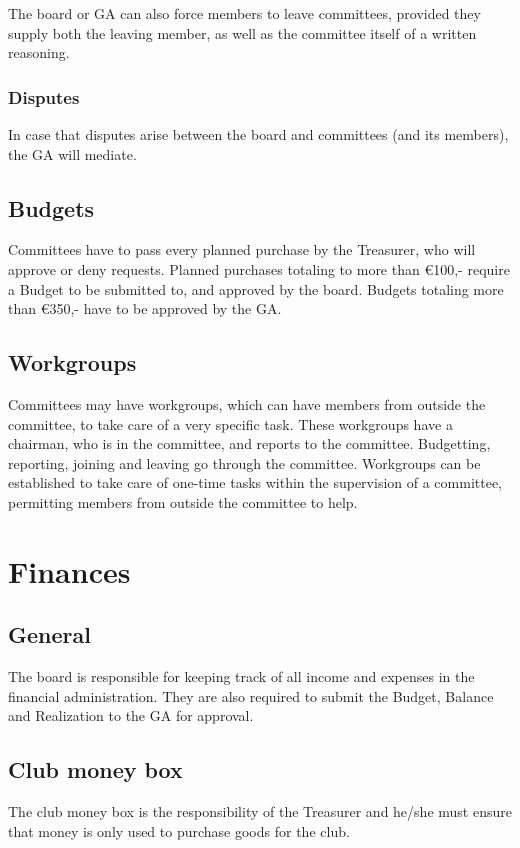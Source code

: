 \documentclass[a4paper]{article}
\begin{document}
The board or GA can also force members to leave committees, provided they supply both the leaving member, as well as the committee itself of a written reasoning.

\subsubsection{Disputes}
In case that disputes arise between the board and committees (and its members), the GA will mediate.

\subsection{Budgets}
Committees have to pass every planned purchase by the Treasurer, who will approve or deny requests. Planned purchases totaling to more than €100,- require a Budget to be submitted to, and approved by the board. Budgets totaling more than €350,- have to be approved by the GA.

\subsection{Workgroups}
Committees may have workgroups, which can have members from outside the committee, to take care of a very specific task. These workgroups have a chairman, who is in the committee, and reports to the committee. Budgetting, reporting, joining and leaving go through the committee. Workgroups can be established to take care of one-time tasks within the supervision of a committee, permitting members from outside the committee to help.

\section{Finances}
\subsection{General}
The board is responsible for keeping track of all income and expenses in the financial administration. They are also required to submit the Budget, Balance and Realization to the GA for approval.

\subsection{Club money box}
The club money box is the responsibility of the Treasurer and he/she must ensure that money is only used to purchase goods for the club.
\end{document}
